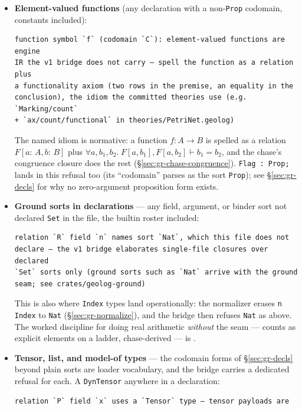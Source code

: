 \begin{itemize}
\item \textbf{Element-valued functions} (any declaration with a
non-\texttt{Prop} codomain, constants included):
\begin{Verbatim}[fontsize=\small,frame=leftline,rulecolor=\color{accentmid},framesep=3mm,xleftmargin=3mm]
function symbol `f` (codomain `C`): element-valued functions are engine
IR the v1 bridge does not carry — spell the function as a relation plus
a functionality axiom (two rows in the premise, an equality in the
conclusion), the idiom the committed theories use (e.g. `Marking/count`
+ `ax/count/functional` in theories/PetriNet.geolog)
\end{Verbatim}
The named idiom is normative: a function $f : A \to B$ is spelled as
a relation $F[a{:}\,A, b{:}\,B]$ plus
$\forall a, b_1, b_2.\; F[a, b_1], F[a, b_2] \vdash b_1 = b_2$, and
the chase's congruence closure does the rest
(\S\ref{sec:gr-chase-congruence}). \texttt{Flag : Prop;} lands in
this refusal too (its ``codomain'' parses as the sort
\texttt{Prop}); see \S\ref{sec:gr-decls} for why no zero-argument
proposition form exists.
\item \textbf{Ground sorts in declarations} — any field, argument, or
binder sort not declared \texttt{Set} in the file, the builtin roster
included:
\begin{Verbatim}[fontsize=\small,frame=leftline,rulecolor=\color{accentmid},framesep=3mm,xleftmargin=3mm]
relation `R` field `n` names sort `Nat`, which this file does not
declare — the v1 bridge elaborates single-file closures over declared
`Set` sorts only (ground sorts such as `Nat` arrive with the ground
seam; see crates/geolog-ground)
\end{Verbatim}
This is also where \texttt{Index} types land operationally: the
normalizer erases \texttt{n Index} to \texttt{Nat}
(\S\ref{sec:gr-normalize}), and the bridge then refuses \texttt{Nat}
as above. The worked discipline for doing real arithmetic
\emph{without} the seam — counts as explicit elements on a ladder,
chase-derived — is .
\item \textbf{Tensor, list, and model-of types} — the codomain
forms of \S\ref{sec:gr-decls} beyond plain sorts are loader
vocabulary, and the bridge carries a dedicated refusal for each. A
\texttt{DynTensor} anywhere in a declaration:
\begin{Verbatim}[fontsize=\small,frame=leftline,rulecolor=\color{accentmid},framesep=3mm,xleftmargin=3mm]
relation `P` field `x` uses a `Tensor` type — tensor payloads are

\end{Verbatim}
\end{itemize}
